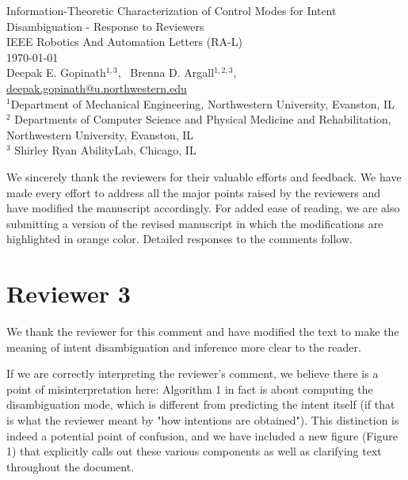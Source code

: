 \documentclass[a4paper,twoside,11pt]{reviewresponse}
\makeatletter
\newcommand{\myAuthors}{{Deepak E. Gopinath$^{\displaystyle 1, 3}$, ~Brenna D. Argall$^{\displaystyle 1,2,3}$, }}
\newcommand{\myEmail}{deepak.gopinath@u.northwestern.edu}
\newcommand{\myTitle}{Information-Theoretic Characterization of Control Modes for Intent Disambiguation - Response to Reviewers}
\newcommand{\myJournal}{IEEE Robotics And Automation Letters (RA-L)}
\newcommand{\myDept}{{$^{\displaystyle 1}$Department of Mechanical Engineering, Northwestern University, Evanston, IL}\\
{$^{\displaystyle 2}$ Departments of Computer Science and Physical Medicine and Rehabilitation, Northwestern University, Evanston, IL  }\\
{$^{\displaystyle 3}$ Shirley Ryan AbilityLab, Chicago, IL }\\}
\makeatother
\begin{document}
\thispagestyle{plain}

\begin{center}
 {\LARGE\myTitle} \vspace{1cm} \\
 {\large\myJournal} \vspace{0.5cm} \\
 \today \vspace{0.5cm} \\
 \myAuthors \\
 \url{\myEmail} \vspace{1cm} \\
 \myDept
\end{center}


We sincerely thank the reviewers for their valuable efforts and feedback. We have made every effort to address all the major points raised by the reviewers and have modified the manuscript accordingly. For added ease of reading, we are also submitting a version of the revised manuscript in which the modifications are highlighted in orange color. Detailed responses to the comments follow.  

\section{Reviewer 3}


We thank the reviewer for this comment and have modified the text to make the meaning of intent disambiguation and inference more clear to the reader.


If we are correctly interpreting the reviewer's comment, we believe 
there is a point of misinterpretation here: Algorithm 1 in fact is about 
computing the disambiguation mode, which is different from predicting 
the intent itself (if that is what the reviewer meant by "how intentions 
are obtained"). This distinction is indeed a potential point of 
confusion, and we have included a new figure (Figure 1) that explicitly 
calls out these various components as well as clarifying text throughout 
the document.
\end{document}
